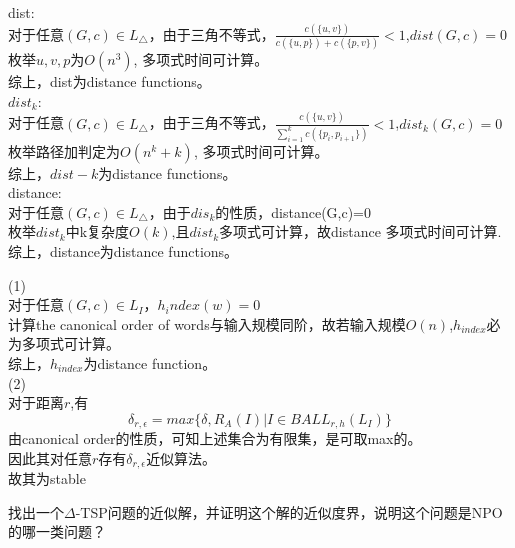 \documentclass[a4paper, justified]{tufte-handout}
\begin{document}
\begin{solution}
dist:\\
对于任意$(G,c)\in L_{\triangle}$，由于三角不等式，$\frac{c(\{u,v\})}{c(\{u,p\})+ {c(\{p,v\})}}<1$,$dist(G,c)=0$\\
枚举$u,v,p$为$O(n^3)$, 多项式时间可计算。\\
综上，dist为distance functions。\\
$dist_{k}$:\\
对于任意$(G,c)\in L_{\triangle}$，由于三角不等式，$\frac{c(\{u,v\})}{\sum_{i=1}^kc(\{p_i, p_{i+1}\})}<1$,$dist_k(G,c)=0$\\
枚举路径加判定为$O(n^k+k)$, 多项式时间可计算。\\
综上，$dist-k$为distance functions。\\
distance:\\
对于任意$(G,c)\in L_{\triangle}$，由于$dis_k$的性质，distance(G,c)=0\\
枚举$dist_k$中k复杂度$O(k)$,且$dist_k$多项式可计算，故distance 多项式时间可计算.\\
综上，distance为distance functions。\\
\end{solution}

\begin{problem}[JH 4.2.3.4]
\end{problem}

\begin{solution}
(1)\\
对于任意$(G,c)\in L_{I}$，$h_index(w)=0$\\
计算the canonical order of words与输入规模同阶，故若输入规模$O(n)$,$h_{index}$必为多项式可计算。\\
综上，$h_{index}$为distance function。\\
(2)\\
对于距离$r$,有
\[
\delta_{r,\epsilon}=max\{\delta, R_{A}(I)| I \in BALL_{r,h}(L_I)\}
\]
由canonical order的性质，可知上述集合为有限集，是可取max的。\\
因此其对任意$r$存有$\delta_{r,\epsilon}$近似算法。\\
故其为stable
\end{solution}

\beginoptional


\beginot
\begin{ot}	
	找出一个$\Delta$-TSP问题的近似解，并证明这个解的近似度界，说明这个问题是NPO的哪一类问题？	
\end{ot}
\end{document}

